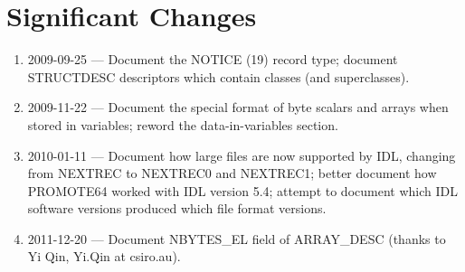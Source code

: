 \documentclass[12pt]{article}
\begin{document}
\section{Significant Changes\label{s:changes}}
\begin{enumerate}
\item 2009-09-25 --- Document the NOTICE (19) record type; document STRUCTDESC descriptors which contain classes (and superclasses).
\item 2009-11-22 --- Document the special format of byte scalars and arrays when stored in variables; reword the data-in-variables section.
\item 2010-01-11 --- Document how large files are now supported by IDL, changing from NEXTREC to NEXTREC0 and NEXTREC1; better document how PROMOTE64 worked with IDL version 5.4; attempt to document which IDL software versions produced which file format versions.
\item 2011-12-20 --- Document NBYTES\_EL field of ARRAY\_DESC (thanks to Yi Qin, Yi.Qin at csiro.au).
\end{enumerate}
\end{document}
